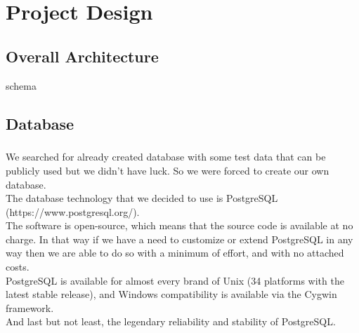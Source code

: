 \chapter{Project Design} %

\section{Overall Architecture}

schema

\section{Database}

\paragraph{}
We searched for already created database with some test data that can be publicly used but we didn’t have luck. So we were forced to create our own database.\\
The database technology that we decided to use is PostgreSQL (https://www.postgresql.org/).\\
The software is open-source, which means that the source code is available at no charge. In that way if we have a need to customize or extend PostgreSQL in any way then we are able to do so with a minimum of effort, and with no attached costs.\\
PostgreSQL is available for almost every brand of Unix (34 platforms with the latest stable release), and Windows compatibility is available via the Cygwin framework.\\
And last but not least, the legendary reliability and stability of PostgreSQL.

